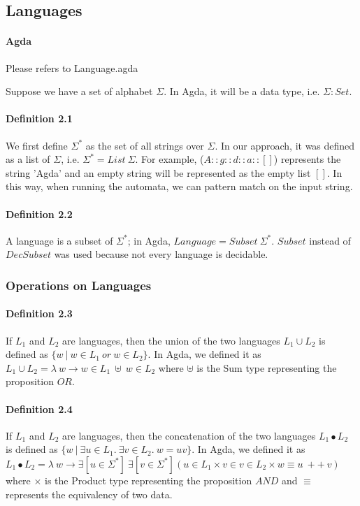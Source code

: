 \documentclass[twoside,openright,final]{bhamthesis}
\begin{document}
\subsection{Languages}
\paragraph{Agda} Please refers to Language.agda \\

\par Suppose we have a set of alphabet \(\Sigma\). In Agda, it will be a data type,
i.e. \(\Sigma : Set\). 

\paragraph{Definition 2.1} We first define \(\Sigma^*\) as the set of all
strings over \(\Sigma\). In our approach, it was defined as a list of
\(\Sigma\), i.e. \(\Sigma^* = List\ \Sigma\). For example, (\(A :: g ::
d :: a :: []\)) represents the string 'Agda' and an empty string will
be represented as the empty list \([]\). In this way, when running the
automata, we can pattern match on the input string. 

\paragraph{Definition 2.2} A language is a subset of
\(\Sigma^*\); in Agda, \(Language = Subset\ \Sigma^*\). 
\(Subset\) instead of \(DecSubset\) was used because not every language is decidable. 

\subsubsection{Operations on Languages}

\paragraph{Definition 2.3} If \(L_1\) and \(L_2\) are languages, then
the union of the two languages \(L_1\cup L_2\) is defined as \(\{w\  |\  w \in L_1\ or\ w \in
L_2\}\). In Agda, we defined it as \(L_1 \cup L_2 = \lambda\ w \to w \in L_1\ \uplus\ w
\in L_2\) where \(\uplus\) is the Sum type representing the
proposition \(OR\). 

\paragraph{Definition 2.4} If \(L_1\) and \(L_2\) are languages, then
the concatenation of the two languages 
\(L_1\bullet L_2\) is defined
as \(\{w\  |\  \exists u\in L_1.\ \exists v\in L_2.\ w = uv\}\). In
Agda, we defined it as \(L_1\bullet L_2 = \lambda\ w \to \exists[
u \in \Sigma^* ]\ \exists[ v \in \Sigma^* ] ( u \in L_1 \times v \in v \in
L_2 \times w \equiv u\ ++\ v ) \) where \(\times\) is the Product type
representing the proposition \(AND\) and \(\equiv\) represents the
equivalency of two data. 
\end{document}
